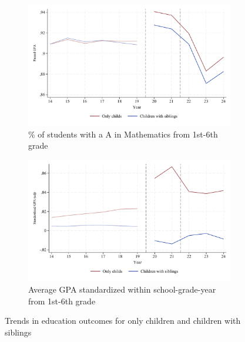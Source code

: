 \begin{figure}[htbp]
    \centering
    
    \begin{subfigure}{\textwidth}
        \centering
        \includegraphics[width=\textwidth]{./FIGURES/Descriptive/raw_total_elm_pass_math_siblings.pdf}
        \caption{\% of students with a A in Mathematics from 1st-6th grade}
        \label{fig:trend_pass}
    \end{subfigure}
    
    \vspace{1em} %
    
    \begin{subfigure}{\textwidth}
        \centering
        \includegraphics[width=\textwidth]{./FIGURES/Descriptive/raw_total_elm_std_gpa_m_adj_siblings.pdf}
        \caption{Average GPA standardized within school-grade-year from 1st-6th grade}
        \label{fig:trend_gpa}
    \end{subfigure}
    
    \caption{Trends in education outcomes for only children and children with siblings}
    \label{fig:trend}
\end{figure}


